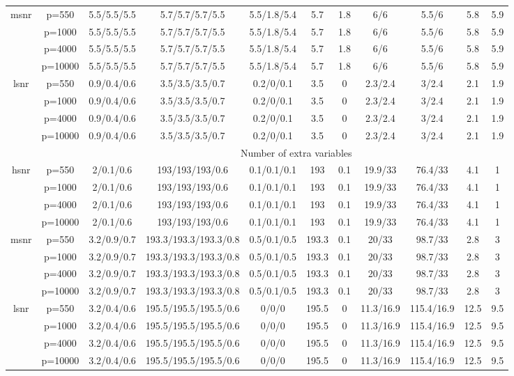 \begin{table}[ht]
{\begin{tabular}{|c|c|ccccccccc|}
  \midrule\multirow{4}[2]{*}{msnr} & p=550 & 5.5/5.5/5.5 & 5.7/5.7/5.7/5.5 & 5.5/1.8/5.4 & 5.7 & 1.8 & 6/6 & 5.5/6 & 5.8 & 5.9 \\ 
   & p=1000 & 5.5/5.5/5.5 & 5.7/5.7/5.7/5.5 & 5.5/1.8/5.4 & 5.7 & 1.8 & 6/6 & 5.5/6 & 5.8 & 5.9 \\ 
   & p=4000 & 5.5/5.5/5.5 & 5.7/5.7/5.7/5.5 & 5.5/1.8/5.4 & 5.7 & 1.8 & 6/6 & 5.5/6 & 5.8 & 5.9 \\ 
   & p=10000 & 5.5/5.5/5.5 & 5.7/5.7/5.7/5.5 & 5.5/1.8/5.4 & 5.7 & 1.8 & 6/6 & 5.5/6 & 5.8 & 5.9 \\ 
  \midrule\multirow{4}[2]{*}{lsnr} & p=550 & 0.9/0.4/0.6 & 3.5/3.5/3.5/0.7 & 0.2/0/0.1 & 3.5 & 0 & 2.3/2.4 & 3/2.4 & 2.1 & 1.9 \\ 
   & p=1000 & 0.9/0.4/0.6 & 3.5/3.5/3.5/0.7 & 0.2/0/0.1 & 3.5 & 0 & 2.3/2.4 & 3/2.4 & 2.1 & 1.9 \\ 
   & p=4000 & 0.9/0.4/0.6 & 3.5/3.5/3.5/0.7 & 0.2/0/0.1 & 3.5 & 0 & 2.3/2.4 & 3/2.4 & 2.1 & 1.9 \\ 
   & p=10000 & 0.9/0.4/0.6 & 3.5/3.5/3.5/0.7 & 0.2/0/0.1 & 3.5 & 0 & 2.3/2.4 & 3/2.4 & 2.1 & 1.9 \\ 
   \midrule 
 \multicolumn{1}{|c}{} &       & \multicolumn{9}{c|}{Number of extra variables} \\
\midrule\multirow{4}[2]{*}{hsnr} & p=550 & 2/0.1/0.6 & 193/193/193/0.6 & 0.1/0.1/0.1 & 193 & 0.1 & 19.9/33 & 76.4/33 & 4.1 & 1 \\ 
   & p=1000 & 2/0.1/0.6 & 193/193/193/0.6 & 0.1/0.1/0.1 & 193 & 0.1 & 19.9/33 & 76.4/33 & 4.1 & 1 \\ 
   & p=4000 & 2/0.1/0.6 & 193/193/193/0.6 & 0.1/0.1/0.1 & 193 & 0.1 & 19.9/33 & 76.4/33 & 4.1 & 1 \\ 
   & p=10000 & 2/0.1/0.6 & 193/193/193/0.6 & 0.1/0.1/0.1 & 193 & 0.1 & 19.9/33 & 76.4/33 & 4.1 & 1 \\ 
  \midrule\multirow{4}[2]{*}{msnr} & p=550 & 3.2/0.9/0.7 & 193.3/193.3/193.3/0.8 & 0.5/0.1/0.5 & 193.3 & 0.1 & 20/33 & 98.7/33 & 2.8 & 3 \\ 
   & p=1000 & 3.2/0.9/0.7 & 193.3/193.3/193.3/0.8 & 0.5/0.1/0.5 & 193.3 & 0.1 & 20/33 & 98.7/33 & 2.8 & 3 \\ 
   & p=4000 & 3.2/0.9/0.7 & 193.3/193.3/193.3/0.8 & 0.5/0.1/0.5 & 193.3 & 0.1 & 20/33 & 98.7/33 & 2.8 & 3 \\ 
   & p=10000 & 3.2/0.9/0.7 & 193.3/193.3/193.3/0.8 & 0.5/0.1/0.5 & 193.3 & 0.1 & 20/33 & 98.7/33 & 2.8 & 3 \\ 
  \midrule\multirow{4}[2]{*}{lsnr} & p=550 & 3.2/0.4/0.6 & 195.5/195.5/195.5/0.6 & 0/0/0 & 195.5 & 0 & 11.3/16.9 & 115.4/16.9 & 12.5 & 9.5 \\ 
   & p=1000 & 3.2/0.4/0.6 & 195.5/195.5/195.5/0.6 & 0/0/0 & 195.5 & 0 & 11.3/16.9 & 115.4/16.9 & 12.5 & 9.5 \\ 
   & p=4000 & 3.2/0.4/0.6 & 195.5/195.5/195.5/0.6 & 0/0/0 & 195.5 & 0 & 11.3/16.9 & 115.4/16.9 & 12.5 & 9.5 \\ 
   & p=10000 & 3.2/0.4/0.6 & 195.5/195.5/195.5/0.6 & 0/0/0 & 195.5 & 0 & 11.3/16.9 & 115.4/16.9 & 12.5 & 9.5 \\ 
   \bottomrule 
\end{tabular}
}
\end{table}

